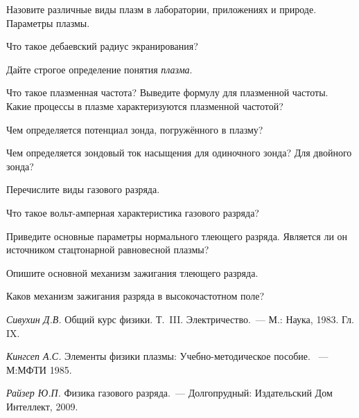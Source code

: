 {\small

\begin{lab:questions}

\item Назовите различные виды плазм в лаборатории, приложениях и природе. Параметры плазмы.

\item Что такое дебаевский радиус экранирования?

\item Дайте строгое определение понятия {\em плазма}.

\item Что такое плазменная частота? Выведите формулу для плазменной частоты. Какие процессы в плазме характеризуются плазменной частотой?

\item Чем определяется потенциал зонда, погружённого в плазму?

\item Чем определяется зондовый ток насыщения для одиночного зонда? Для двойного зонда?

\item Перечислите виды газового разряда.

\item Что такое вольт-амперная характеристика газового разряда?

\item Приведите основные параметры нормального тлеющего разряда. Является ли он источником стацтонарной равновесной плазмы?

\item Опишите основной механизм зажигания тлеющего разряда.

\item Каков механизм зажигания разряда в высокочастотном поле?

\end{lab:questions}


\begin{lab:literature}

\item \emph{Сивухин Д.В.} Общий курс физики. Т.~III. Электричество.~--- М.: Наука, 1983. Гл. IX.

\item \emph{Кингсеп А.С.} Элементы физики плазмы: Учебно-методическое пособие. ~--- М:МФТИ 1985.

\item \emph{Райзер Ю.П.} Физика газового разряда.~--- Долгопрудный: Издательский Дом Интеллект, 2009.


\end{lab:literature}}
